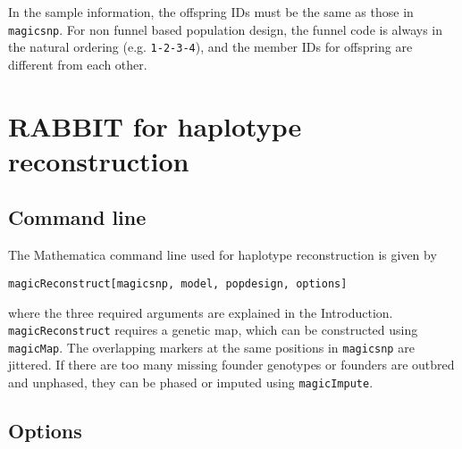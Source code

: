 \documentclass[12pt]{article}
\begin{document}
In the sample information, the offspring IDs must be the same as those in \verb|magicsnp|. For non funnel based population design, the funnel code is always in the natural ordering (e.g. \verb|1-2-3-4|), and the member IDs for offspring are different from each other. 

\section{RABBIT for haplotype reconstruction}

\subsection{Command line}

The Mathematica command line used for haplotype reconstruction is given by
\begin{verbatim}
magicReconstruct[magicsnp, model, popdesign, options]
\end{verbatim}
where the three required arguments are explained in the Introduction. \verb|magicReconstruct| requires a genetic map, which can be constructed using \verb|magicMap|. The overlapping markers at the same positions in \verb|magicsnp| are jittered. If there are too many missing founder genotypes or founders are outbred and unphased, they can be phased or imputed using \verb|magicImpute|.  


\subsection{Options}
\end{document}
